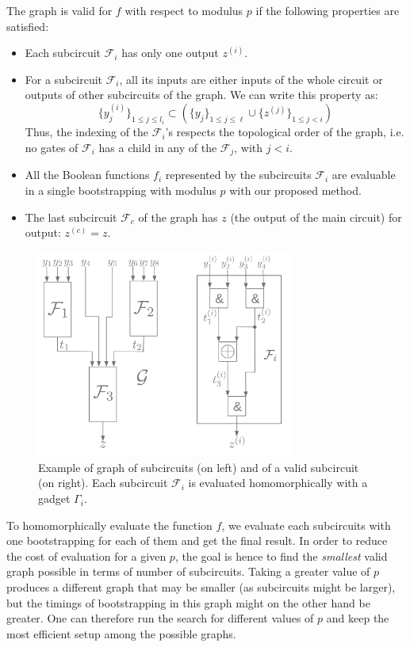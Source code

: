 The graph is valid for $f$ with respect to modulus $p$ if the following properties are satisfied:
\begin{itemize}
    \item Each subcircuit $\mathcal{F}_i$ has only one output $z^{(i)}$.
    \item For a subcircuit $\mathcal{F}_i$, all its inputs are either inputs of the whole circuit or outputs of other subcircuits of the graph. We can write this property as:
    $$
    \{y_j^{(i)}\}_{1 \le j \le l_i} \subset \left ( \{y_j\}_{1 \le j \le \ell} \cup \{z^{(j)}\}_{1 \le j < i} \right )
    $$
    Thus, the indexing of the $\mathcal{F}_i$'s respects the topological order of the graph, i.e. no gates of $\mathcal{F}_i$ has a child in any of the $\mathcal{F}_j$, with $j < i$.
    \item All the Boolean functions $f_i$ represented by the subcircuits $\mathcal{F}_i$ are evaluable in a single bootstrapping with modulus $p$ with our proposed method. 
    \item The last subcircuit $\mathcal{F}_c$ of the graph has $z$ (the output of the main circuit) for output: $z^{(c)} = z$.
\end{itemize}

\begin{figure}
    \centering
    \includegraphics[width=0.75\textwidth]{images/graphs.png}
    \caption{Example of graph of subcircuits (on left) and of a valid subcircuit (on right). Each subcircuit $\mathcal{F}_i$ is evaluated homomorphically with a gadget $\Gamma_i$.}
    \label{fig:enter-label}
\end{figure}




To homomorphically evaluate the function $f$, we evaluate each subcircuits with one bootstrapping for each of them and get the final result. In order to reduce the cost of evaluation for a given $p$, the goal is hence to find the \emph{smallest} valid graph possible in terms of number of subcircuits. Taking a greater value of $p$ produces a different graph that may be smaller (as subcircuits might be larger), but the timings of bootstrapping in this graph might on the other hand be greater. One can therefore run the search for different values of $p$ and keep the most efficient setup among the possible graphs. %


